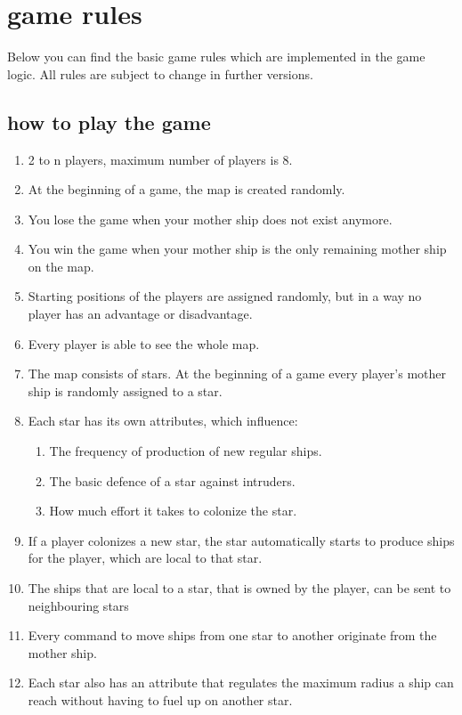 \chapter{game rules}
Below you can find the basic game rules which are implemented in the game logic. All rules are subject to change in further versions.

\section{how to play the game}
\begin{enumerate}
	\item 2 to n players, maximum number of players is 8.
	\item At the beginning of a game, the map is created randomly.
	\item You lose the game when your mother ship does not exist anymore.
	\item You win the game when your mother ship is the only remaining mother ship on the map.
	\item Starting positions of the players are assigned randomly, but in a way no player has an advantage or disadvantage.
	\item Every player is able to see the whole map.
	\item The map consists of stars. At the beginning of a game every player's mother ship is randomly assigned to a star.
	\item Each star has its own attributes, which influence:  
		\begin{enumerate}[label=\alph*)]
		\item The frequency of production of new regular ships.
		\item The basic defence of a star against intruders.
		\item How much effort it takes to colonize the star.
		\end{enumerate}
		\item If a player colonizes a new star, the star automatically starts to produce ships for the player, which are local to that star.
	\item The ships that are local to a star, that is owned by the player, can be sent to neighbouring stars
	\item Every command to move ships from one star to another originate from the mother ship.
	\item Each star also has an attribute that regulates the maximum radius a ship can reach without having to fuel up on another star.

\end{enumerate}
